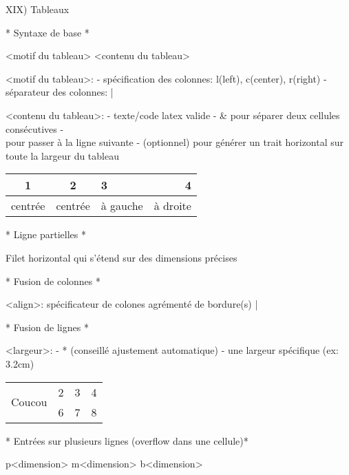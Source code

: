 XIX) Tableaux

\usepackage{array}

* Syntaxe de base *

\begin{tabular}{<motif du tableau>}
	<contenu du tableau>
\end{tabular}

<motif du tableau>:
	- spécification des colonnes: l(left), c(center), r(right)
	- séparateur des colonnes: |

<contenu du tableau>:
	- texte/code latex valide
	- & pour séparer deux cellules consécutives
	- \\ pour passer à la ligne suivante
	- \hline (optionnel) pour générer un trait horizontal sur toute la largeur du tableau

\begin{tabular}{|c|c|l|r}
	\hline
	1 & 2 & 3 & 4 \\
	\hline
	centrée & centrée & à gauche & à droite
	\hline
\end{tabular}

* Ligne partielles *

Filet horizontal qui s'étend sur des dimensions précises


* Fusion de colonnes *


<align>: spécificateur de colones agrémenté de bordure(s) |

* Fusion de lignes *

\usepackage{multirow}

<largeur>: 
	- * (conseillé ajustement automatique)
	- une largeur spécifique (ex: 3.2cm)

\begin{tabular}{|c|c|c|c|}\hline
	\multirow{2}{*}{Coucou} & 2 & 3 & 4 \\\cline{2-4}
							& 6 & 7 & 8 \\\hline
\end{tabular}

* Entrées sur plusieurs lignes (overflow dans une cellule)*


p{<dimension>} %
m{<dimension>} %
b{<dimension>} %

